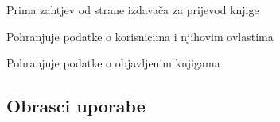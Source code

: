 \begin{packed_enum}
                		\item {}
                		\begin{packed_enum}
                    			\item Prima zahtjev od strane izdavača za prijevod knjige
                		\end{packed_enum}

                		\item {}
                		\begin{packed_enum}
                    			\item Pohranjuje podatke o korisnicima i njihovim ovlastima
                    			\item Pohranjuje podatke o objavljenim knjigama
                		\end{packed_enum}
			\end{packed_enum}
			
			\eject 
			
			
			\subsection{Obrasci uporabe}
				

				
